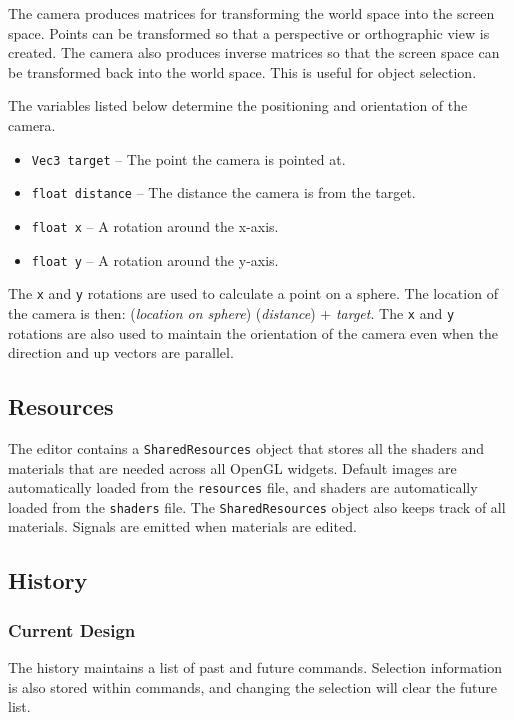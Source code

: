 \documentclass[11pt,letterpaper]{article}
\begin{document}
The camera produces matrices for transforming the world space into the screen space. Points can be transformed so that a perspective or orthographic view is created. The camera also produces inverse matrices so that the screen space can be transformed back into the world space. This is useful for object selection.

The variables listed below determine the positioning and orientation of the camera.
\begin{itemize}
\item \texttt{Vec3 target} -- The point the camera is pointed at.
\item \texttt{float distance} -- The distance the camera is from the target.
\item \texttt{float x} -- A rotation around the x-axis.
\item \texttt{float y} -- A rotation around the y-axis.
\end{itemize}

The \texttt{x} and \texttt{y} rotations are used to calculate a point on a sphere. The location of the camera is then: (\textit{location on sphere}) (\textit{distance}) +  \textit{target}. The \texttt{x} and \texttt{y} rotations are also used to maintain the orientation of the camera even when the direction and up vectors are parallel.

\subsection{Resources}

The editor contains a \texttt{SharedResources} object that stores all the shaders and materials that are needed across all OpenGL widgets. Default images are automatically loaded from the \texttt{resources} file, and shaders are automatically loaded from the \texttt{shaders} file. The \texttt{SharedResources} object also keeps track of all materials. Signals are emitted when materials are edited.

\subsection{History}

\subsubsection{Current Design}

The history maintains a list of past and future commands. Selection information is also stored within commands, and changing the selection will clear the future list.
\end{document}
